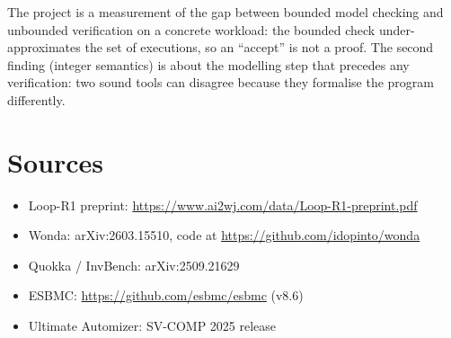 \documentclass[11pt]{article}
\begin{document}
The project is a measurement of the gap between bounded model checking and unbounded
verification on a concrete workload: the bounded check under-approximates the set of executions,
so an ``accept'' is not a proof. The second finding (integer semantics) is about the modelling
step that precedes any verification: two sound tools can disagree because they formalise the
program differently.

\section{Sources}
\label{sec:refs}

\begin{itemize}
\item Loop-R1 preprint: \url{https://www.ai2wj.com/data/Loop-R1-preprint.pdf}
\item Wonda: arXiv:2603.15510, code at \url{https://github.com/idopinto/wonda}
\item Quokka / InvBench: arXiv:2509.21629
\item ESBMC: \url{https://github.com/esbmc/esbmc} (v8.6)
\item Ultimate Automizer: SV-COMP 2025 release
\end{itemize}
\end{document}
